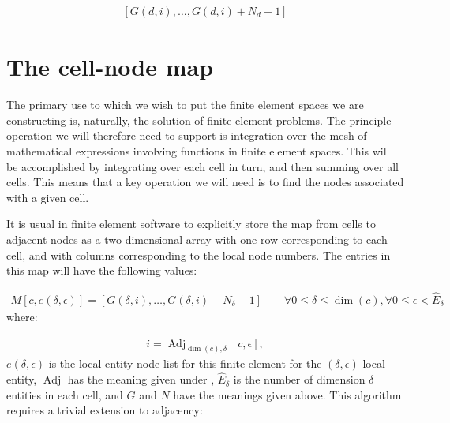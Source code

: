 \documentclass{book}
\begin{document}
\label{\detokenize{4_function_spaces:equation-4_function_spaces:0}}\begin{equation}\label{equation:4_function_spaces:4_function_spaces:0}
\begin{split}[G(d, i), \ldots, G(d,i) + N_d - 1]\end{split}
\end{equation}

\section{The cell-node map}
\label{\detokenize{4_function_spaces:the-cell-node-map}}\label{\detokenize{4_function_spaces:cell-node}}
The primary use to which we wish to put the finite element spaces we
are constructing is, naturally, the solution of finite element
problems. The principle operation we will therefore need to support is
integration over the mesh of mathematical expressions involving
functions in finite element spaces. This will be accomplished by
integrating over each cell in turn, and then summing over all
cells. This means that a key operation we will need is to find the
nodes associated with a given cell.

It is usual in finite element software to explicitly store the map
from cells to adjacent nodes as a two-dimensional array with one row
corresponding to each cell, and with columns corresponding to the
local node numbers. The entries in this map will have the following values:

\label{\detokenize{4_function_spaces:equation-eqcellnode}}\begin{equation}\label{equation:4_function_spaces:eqcellnode}
\begin{split}M[c, e(\delta, \epsilon)] = [G(\delta, i), \ldots, G(\delta,i) + N_\delta - 1] \qquad\forall 0\leq\delta\leq\dim(c), \forall 0\leq\epsilon < \hat{E}_\delta\end{split}
\end{equation}
where:

\label{\detokenize{4_function_spaces:equation-4_function_spaces:1}}\begin{equation}\label{equation:4_function_spaces:4_function_spaces:1}
\begin{split}i = \operatorname{Adj}_{\dim(c), \delta}[c, \epsilon],\end{split}
\end{equation}
\(e(\delta, \epsilon)\) is the local entity-node list for this finite
element for the \((\delta, \epsilon)\) local entity,
\(\operatorname{Adj}\) has the meaning given under {\hyperref[\detokenize{3_meshes:secadjacency}]{}},
\(\hat{E}_\delta\) is the number of dimension \(\delta\) entities in each
cell, and \(G\) and \(N\) have the meanings given above. This algorithm
requires a trivial extension to adjacency:
\end{document}
